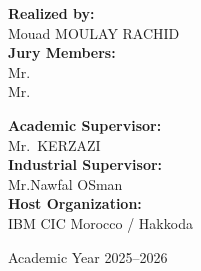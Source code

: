 \begin{center}
  \begin{minipage}{0.46\textwidth}
    \begin{flushleft}
      \textbf{Realized by:}\\[0.25cm]
      {\normalsize Mouad MOULAY RACHID}\\[0.7cm]
      \textbf{Jury Members:}\\[0.25cm]
      {\normalsize Mr.\ }\\[0.15cm]
      {\normalsize Mr.\ }
    \end{flushleft}
  \end{minipage}
  \hfill
  \begin{minipage}{0.46\textwidth}
    \begin{flushright}
      \textbf{Academic Supervisor:}\\[0.25cm]
      {\normalsize Mr.\ KERZAZI}\\[0.7cm]
      \textbf{Industrial Supervisor:}\\[0.25cm]
      {\normalsize Mr.Nawfal OSman}\\[0.15cm]
      \textbf{Host Organization:}\\[0.15cm]
      {\normalsize IBM CIC Morocco / Hakkoda}
    \end{flushright}
  \end{minipage}

  \vfill

  {\large Academic Year 2025--2026}

\end{center}
\newpage
